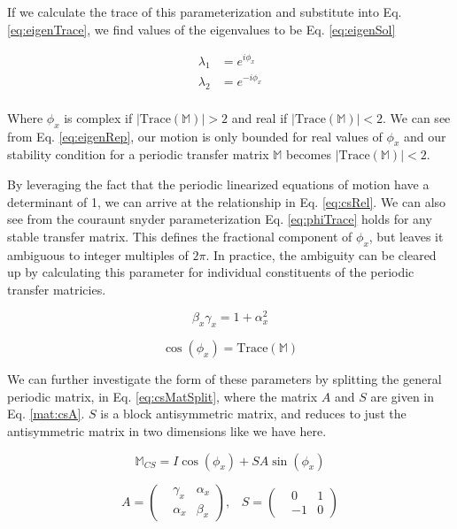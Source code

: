 If we calculate the trace of this parameterization and substitute into Eq. \ref{eq:eigenTrace}, we find values of the eigenvalues to be Eq. \ref{eq:eigenSol}

\begin{equation} \label{eq:eigenSol}
\begin{split}
	\lambda_1 &= e^{i\phi_x}\\
	\lambda_2 &= e^{-i\phi_x}\\
\end{split}
\end{equation}

Where $\phi_x$ is complex if $|\mathrm{Trace}(\mathbb{M})| > 2$ and real if $|\mathrm{Trace}(\mathbb{M})| < 2$. We can see from Eq. \ref{eq:eigenRep}, our motion is only bounded for real values of $\phi_x$ and our stability condition for a periodic transfer matrix $\mathbb{M}$ becomes $|\mathrm{Trace}(\mathbb{M})| < 2$.

By leveraging the fact that the periodic linearized equations of motion have a determinant of 1, we can arrive at the relationship in Eq. \ref{eq:csRel}. We can also see from the couraunt snyder parameterization Eq. \ref{eq:phiTrace} holds for any stable transfer matrix. This defines the fractional component of $\phi_x$, but leaves it ambiguous to integer multiples of $2\pi$. In practice, the ambiguity can be cleared up by calculating this parameter for individual constituents of the periodic transfer matricies.

\begin{equation} \label{eq:csRel}
	\beta_x \gamma_x  = 1 + \alpha_x^2
\end{equation}

\begin{equation} \label{eq:phiTrace}
	\cos{\left(\phi_x\right)} = \mathrm{Trace}(\mathbb{M})
\end{equation}

We can further investigate the form of these parameters by splitting the general periodic matrix, in Eq. \ref{eq:csMatSplit}, where the matrix $A$ and $S$ are given in Eq. \ref{mat:csA}. $S$ is a block antisymmetric matrix, and reduces to just the antisymmetric matrix in two dimensions like we have here.

\begin{equation} \label{eq:csMatSplit}
	\mathbb{M}_{CS} = I \cos{\left(\phi_x\right)} + S A \sin{\left(\phi_x\right)}
\end{equation}

\begin{equation} \label{mat:csA}
	A = 
\begin{pmatrix}
	&\gamma_x &\alpha_x\\
	&\alpha_x &\beta_x
\end{pmatrix},
\hspace{10pt} S =
\begin{pmatrix}
	&0 &1\\
	&-1 &0
\end{pmatrix}
\end{equation}

